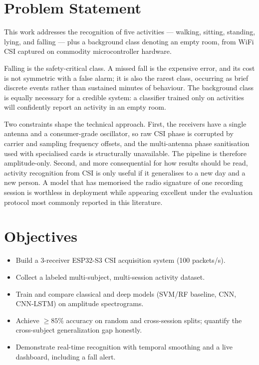 \section{Problem Statement}

This work addresses the recognition of five activities --- walking, sitting,
standing, lying, and falling --- plus a background class denoting an empty
room, from WiFi CSI captured on commodity microcontroller hardware.

Falling is the safety-critical class. A missed fall is the expensive error,
and its cost is not symmetric with a false alarm; it is also the rarest class,
occurring as brief discrete events rather than sustained minutes of
behaviour. The background class is equally necessary for a credible system:
a classifier trained only on activities will confidently report an activity
in an empty room.

Two constraints shape the technical approach. First, the receivers have a
single antenna and a consumer-grade oscillator, so raw CSI phase is corrupted
by carrier and sampling frequency offsets, and the multi-antenna phase
sanitisation used with specialised cards is structurally unavailable. The
pipeline is therefore amplitude-only. Second, and more consequential for how
results should be read, activity recognition from CSI is only useful if it
generalises to a new day and a new person. A model that has memorised the
radio signature of one recording session is worthless in deployment while
appearing excellent under the evaluation protocol most commonly reported in
this literature.

\section{Objectives}
\begin{itemize}
  \item Build a 3-receiver ESP32-S3 CSI acquisition system (100 packets/s).
  \item Collect a labeled multi-subject, multi-session activity dataset.
  \item Train and compare classical and deep models (SVM/RF baseline,
        CNN, CNN-LSTM) on amplitude spectrograms.
  \item Achieve $\geq 85\%$ accuracy on random and cross-session splits;
        quantify the cross-subject generalization gap honestly.
  \item Demonstrate real-time recognition with temporal smoothing and a
        live dashboard, including a fall alert.
\end{itemize}


